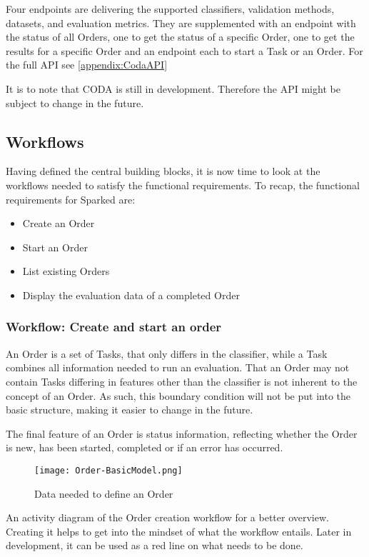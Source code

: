 Four endpoints are delivering the supported classifiers, validation methods, datasets, and evaluation metrics. They are supplemented with an endpoint with the status of all Orders, one to get the status of a specific Order, one to get the results for a specific Order and an endpoint each to start a Task or an Order. For the full API see \ref{appendix:CodaAPI}

It is to note that CODA is still in development. Therefore the API might be subject to change in the future. 

\subsection{Workflows}
Having defined the central building blocks, it is now time to look at the workflows needed to satisfy the functional requirements. To recap, the functional requirements for Sparked are:
\begin{itemize}
\item Create an Order
\item Start an Order
\item List existing Orders
\item Display the evaluation data of a completed Order

\end{itemize}

\subsubsection{Workflow: Create and start an order}
An Order is a set of Tasks, that only differs in the classifier, while a Task combines all information needed to run an evaluation. That an Order may not contain Tasks differing in features other than the classifier is not inherent to the concept of an Order. As such, this boundary condition will not be put into the basic structure, making it easier to change in the future. 

The final feature of an Order is status information, reflecting whether the Order is new, has been started, completed or if an error has occurred.
 
\begin{figure}
	\texttt{[image: Order-BasicModel.png]}
	\caption{Data needed to define an Order}
\end{figure}

An activity diagram of the Order creation workflow for a better overview. Creating it helps to get into the mindset of what the workflow entails. Later in development, it can be used as a red line on what needs to be done.
 
